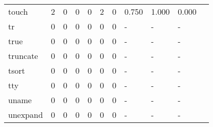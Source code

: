 \begin{longtable}{lp{1.10cm}p{1.10cm}p{1.10cm}p{1.10cm}p{1.10cm}p{1.10cm}p{1.10cm}p{1.10cm}p{1.10cm}p{1.10cm}}
touch     &                      2 &                                  0 &                                 0 &                                0 &                                 2 &                               0 &                          0.750 &                                 1.000 &                               0.000 \\
tr        &                      0 &                                  0 &                                 0 &                                0 &                                 0 &                               0 &                              - &                                     - &                                   - \\
true      &                      0 &                                  0 &                                 0 &                                0 &                                 0 &                               0 &                              - &                                     - &                                   - \\
truncate  &                      0 &                                  0 &                                 0 &                                0 &                                 0 &                               0 &                              - &                                     - &                                   - \\
tsort     &                      0 &                                  0 &                                 0 &                                0 &                                 0 &                               0 &                              - &                                     - &                                   - \\
tty       &                      0 &                                  0 &                                 0 &                                0 &                                 0 &                               0 &                              - &                                     - &                                   - \\
uname     &                      0 &                                  0 &                                 0 &                                0 &                                 0 &                               0 &                              - &                                     - &                                   - \\
unexpand  &                      0 &                                  0 &                                 0 &                                0 &                                 0 &                               0 &                              - &                                     - &                                   - \\

\end{longtable}

